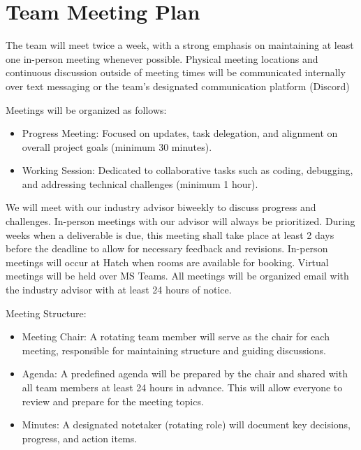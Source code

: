 \documentclass{article}
\begin{document}
\section{Team Meeting Plan}

The team will meet twice a week, with a strong emphasis on maintaining at least one in-person meeting whenever possible. Physical meeting locations and continuous discussion outside of meeting times will be communicated internally over text messaging or the team’s designated communication platform (Discord)\par

Meetings will be organized as follows:

\begin{itemize}
  \item Progress Meeting: Focused on updates, task delegation, and alignment on overall project goals (minimum 30 minutes).
  \item Working Session: Dedicated to collaborative tasks such as coding, debugging, and addressing technical challenges (minimum 1 hour).
\end{itemize}

\begin{flushleft}
  We will meet with our industry advisor biweekly to discuss progress and challenges. In-person meetings with our advisor will always be prioritized. During weeks when a deliverable is due, this meeting shall take place at least 2 days before the deadline to allow for necessary feedback and revisions. 
  In-person meetings will occur at Hatch when rooms are available for booking.
  Virtual meetings will be held over MS Teams. All meetings will be organized email with the industry advisor with at least 24 hours of notice.\par

  Meeting Structure:
\end{flushleft}

\begin{itemize}
  \item Meeting Chair: A rotating team member will serve as the chair for each meeting, responsible for maintaining structure and guiding discussions.
  \item Agenda: A predefined agenda will be prepared by the chair and shared with all team members at least 24 hours in advance. This will allow everyone to review and prepare for the meeting topics.
  \item Minutes: A designated notetaker (rotating role) will document key decisions, progress, and action items.
\end{itemize}
\end{document}
